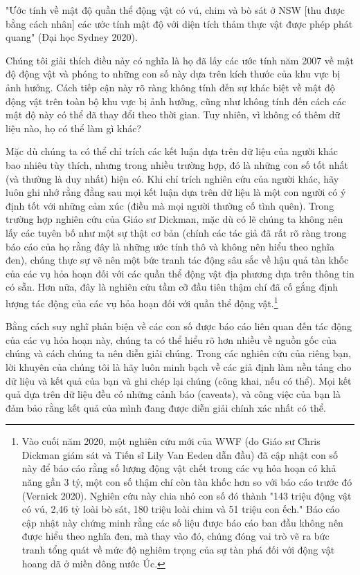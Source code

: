 "Ước tính về mật độ quần thể động vật có vú, chim và bò sát ở NSW [thu được bằng cách nhân] các ước tính mật độ với diện tích thảm thực vật được phép phát quang" (Đại học Sydney 2020).

Chúng tôi giải thích điều này có nghĩa là họ đã lấy các ước tính năm 2007 về mật độ động vật và phóng to những con số này dựa trên kích thước của khu vực bị ảnh hưởng. Cách tiếp cận này rõ ràng không tính đến sự khác biệt về mật độ động vật trên toàn bộ khu vực bị ảnh hưởng, cũng như không tính đến cách các mật độ này có thể đã thay đổi theo thời gian. Tuy nhiên, vì không có thêm dữ liệu nào, họ có thể làm gì khác?

Mặc dù chúng ta có thể chỉ trích các kết luận dựa trên dữ liệu của người khác bao nhiêu tùy thích, nhưng trong nhiều trường hợp, đó là những con số tốt nhất (và thường là duy nhất) hiện có. Khi chỉ trích nghiên cứu của người khác, hãy luôn ghi nhớ rằng đằng sau mọi kết luận dựa trên dữ liệu là một con người có ý định tốt với những cảm xúc (điều mà mọi người thường cố tình quên). Trong trường hợp nghiên cứu của Giáo sư Dickman, mặc dù có lẽ chúng ta không nên lấy các tuyên bố như một sự thật cơ bản (chính các tác giả đã rất rõ ràng trong báo cáo của họ rằng đây là những ước tính thô và không nên hiểu theo nghĩa đen), chúng thực sự vẽ nên một bức tranh tác động sâu sắc về hậu quả tàn khốc của các vụ hỏa hoạn đối với các quần thể động vật địa phương dựa trên thông tin có sẵn. Hơn nữa, đây là nghiên cứu tầm cỡ đầu tiên thậm chí đã cố gắng định lượng tác động của các vụ hỏa hoạn đối với quần thể động vật.\footnote{Vào cuối năm 2020, một nghiên cứu mới của WWF (do Giáo sư Chris Dickman giám sát và Tiến sĩ Lily Van Eeden dẫn đầu) đã cập nhật con số này để báo cáo rằng số lượng động vật chết trong các vụ hỏa hoạn có khả năng gần 3 tỷ, một con số thậm chí còn tàn khốc hơn so với báo cáo trước đó (Vernick 2020). Nghiên cứu này chia nhỏ con số đó thành "143 triệu động vật có vú, 2,46 tỷ loài bò sát, 180 triệu loài chim và 51 triệu con ếch." Báo cáo cập nhật này chứng minh rằng các số liệu được báo cáo ban đầu không nên được hiểu theo nghĩa đen, mà thay vào đó, chúng đóng vai trò vẽ ra bức tranh tổng quát về mức độ nghiêm trọng của sự tàn phá đối với động vật hoang dã ở miền đông nước Úc.}

Bằng cách suy nghĩ phản biện về các con số được báo cáo liên quan đến tác động của các vụ hỏa hoạn này, chúng ta có thể hiểu rõ hơn nhiều về nguồn gốc của chúng và cách chúng ta nên diễn giải chúng. Trong các nghiên cứu của riêng bạn, lời khuyên của chúng tôi là hãy luôn minh bạch về các giả định làm nền tảng cho dữ liệu và kết quả của bạn và ghi chép lại chúng (công khai, nếu có thể). Mọi kết quả dựa trên dữ liệu đều có những cảnh báo (caveats), và công việc của bạn là đảm bảo rằng kết quả của mình đang được diễn giải chính xác nhất có thể.

